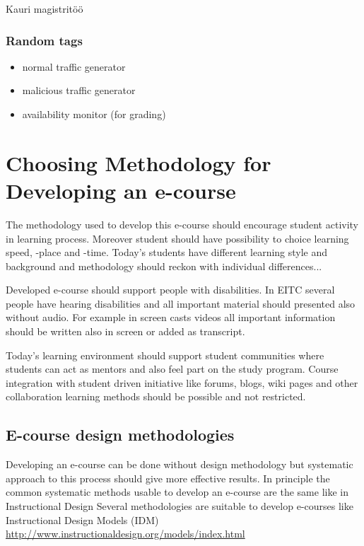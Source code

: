 Kauri magistritöö




\subsubsection{Random tags}
\begin{itemize}
	\item normal traffic generator
	\item malicious traffic generator
	\item availability monitor (for grading)
\end{itemize}


\section{Choosing Methodology for Developing an e-course}



The methodology used to develop this e-course should encourage student activity in learning process. Moreover student should have possibility to choice learning speed, -place and -time. Today's students have different learning style and background and methodology should reckon with individual differences...

Developed e-course should support people with disabilities. In \gls{EITC} several people have hearing disabilities and all important material should presented also without audio. For example in screen casts videos all important information should be written also in screen or added as transcript.

Today’s learning environment should support student communities where students can act as mentors and also feel part on the study program. Course integration with student driven initiative like forums, blogs, wiki pages and other collaboration learning methods should be possible and not restricted.

\subsection{E-course design methodologies}

Developing an e-course can be done without design methodology but systematic approach to this process should give more effective results. In principle the common systematic methods usable to develop an e-course are the same like in Instructional Design 
Several methodologies are suitable to develop e-courses like Instructional Design Models (IDM)
\url{http://www.instructionaldesign.org/models/index.html}


